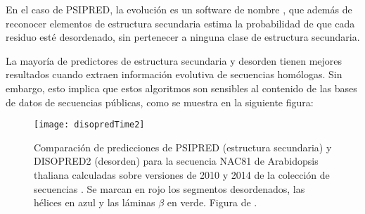 {En el caso de PSIPRED, la evoluci\'{o}n es un software de nombre
 \citep{Ward2004},
que adem\'{a}s de reconocer elementos de estructura secundaria estima la probabilidad de que cada residuo est\'{e} desordenado,
sin pertenecer a ninguna clase de estructura secundaria.

La mayor\'{i}a de predictores de estructura secundaria y desorden tienen mejores resultados cuando
extraen informaci\'{o}n evolutiva de secuencias hom\'{o}logas. Sin embargo, esto implica que 
estos algoritmos son sensibles al contenido de las bases de datos de secuencias p\'{u}blicas, 
como se muestra en la siguiente figura:

\begin{figure}
\begin{center} 
\texttt{[image: disopredTime2]}
\caption%
{
Comparaci\'{o}n de predicciones de PSIPRED (estructura secundaria) y DISOPRED2 (desorden) 
para la secuencia NAC81 de Arabidopsis thaliana calculadas sobre versiones de 2010 y 2014 
de la colecci\'{o}n de secuencias .
Se marcan en rojo los segmentos desordenados, las h\'{e}lices en azul y las l\'{a}minas $\beta$ en verde.
Figura de \citet{Yruela2014}.
}
\label{fig:disopredTime}
\end{center}
\end{figure}


}
